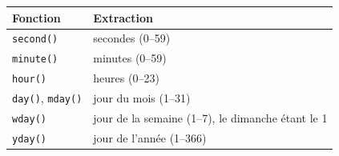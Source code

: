\documentclass[
  11pt,
]{book}
\numberwithin{equation}{section}
\numberwithin{countremarque}{section}
\begin{document}
\begin{longtable}[]{@{}ll@{}}
\toprule
\begin{minipage}[b]{0.43\columnwidth}\raggedright
Fonction\strut
\end{minipage} & \begin{minipage}[b]{0.51\columnwidth}\raggedright
Extraction\strut
\end{minipage}\tabularnewline
\midrule
\endhead
\begin{minipage}[t]{0.43\columnwidth}\raggedright
\texttt{second()}\strut
\end{minipage} & \begin{minipage}[t]{0.51\columnwidth}\raggedright
secondes (0--59)\strut
\end{minipage}\tabularnewline
\begin{minipage}[t]{0.43\columnwidth}\raggedright
\texttt{minute()}\strut
\end{minipage} & \begin{minipage}[t]{0.51\columnwidth}\raggedright
minutes (0--59)\strut
\end{minipage}\tabularnewline
\begin{minipage}[t]{0.43\columnwidth}\raggedright
\texttt{hour()}\strut
\end{minipage} & \begin{minipage}[t]{0.51\columnwidth}\raggedright
heures (0--23)\strut
\end{minipage}\tabularnewline
\begin{minipage}[t]{0.43\columnwidth}\raggedright
\texttt{day()}, \texttt{mday()}\strut
\end{minipage} & \begin{minipage}[t]{0.51\columnwidth}\raggedright
jour du mois (1--31)\strut
\end{minipage}\tabularnewline
\begin{minipage}[t]{0.43\columnwidth}\raggedright
\texttt{wday()}\strut
\end{minipage} & \begin{minipage}[t]{0.51\columnwidth}\raggedright
jour de la semaine (1--7), le dimanche étant le 1\strut
\end{minipage}\tabularnewline
\begin{minipage}[t]{0.43\columnwidth}\raggedright
\texttt{yday()}\strut
\end{minipage} & \begin{minipage}[t]{0.51\columnwidth}\raggedright
jour de l'année (1--366)\strut
\end{minipage}\tabularnewline

\end{longtable}
\end{document}
